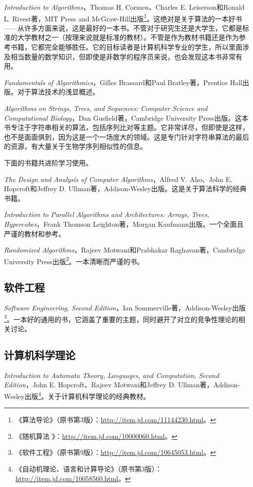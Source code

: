\textit{Introduction to Algorithms}，Thomas H. Cormen、Charles E.  Leiserson和Ronald L. Rivest著，MIT Press and McGraw-Hill出版\footnote{《算法导论》（原书第3版）：\href{http://item.jd.com/11144230.html}{http://item.jd.com/11144230.html}。}。这绝对是关于算法的一本好书——从许多方面来说，这是最好的一本书。不管对于研究生还是大学生，它都是标准的大学教材之一（按理来说就是标准的教材）。不管是作为教材书籍还是作为参考书籍，它都完全能够胜任。它的目标读者是计算机科学专业的学生，所以里面涉及相当数量的数学知识，但即使是非数学的程序员来说，也会发现这本书非常有用。

\textit{Fundamentals of Algorithmics}，Gilles Brassard和Paul Bratley著，Prentice Hall出版。对于算法技术的浅显概述。

\textit{Algorithms on Strings, Trees, and Sequences: Computer Science and Computational Biology}，Dan Gusfield著，Cambridge University Press出版。这本书专注于字符串相关的算法，包括序列比对等主题。它非常详尽，但即使是这样，也不是面面俱到，因为这是一个一场庞大的领域。这是专门针对字符串算法的最后的资源，有大量关于生物学序列相似性的信息。

下面的书籍共进阶学习使用。

\textit{The Design and Analysis of Computer Algorithms}，Alfred V.  Aho、John E. Hopcroft和Jeffrey D. Ullman著，Addison-Wesley出版。这是关于算法科学的经典书籍。

\textit{Introduction to Parallel Algorithms and Architectures: Arrays, Trees, Hypercubes}，Frank Thomson Leighton著，Morgan Kaufmann出版。一个全面且严谨的教材和参考。

\textit{Randomized Algorithms}，Rajeev Motwani和Prabhakar Raghavan著，Cambridge University Press出版\footnote{《随机算法 》：\href{http://item.jd.com/10000060.html}{http://item.jd.com/10000060.html}。}。一本清晰而严谨的书。

\subsection{软件工程} \textit{Software Engineering, Second Edition}，Ian Sommerville著，Addison-Wesley出版\footnote{《软件工程》（原书第9版）：\href{http://item.jd.com/10645053.html}{http://item.jd.com/10645053.html}。}。一本好的通用的书，它涵盖了重要的主题，同时避开了对立的竞争性理论的相关讨论。

\subsection{计算机科学理论}
\textit{Introduction to Automata Theory, Languages, and Computation, Second Edition}，John E. Hopcroft、Rajeev Motwani和Jeffrey D.  Ullman著，Addison-Wesley出版\footnote{《自动机理论、语言和计算导论》（原书第3版）：\href{http://item.jd.com/10058560.html}{http://item.jd.com/10058560.html}。}。关于计算机科学理论的经典教材。

